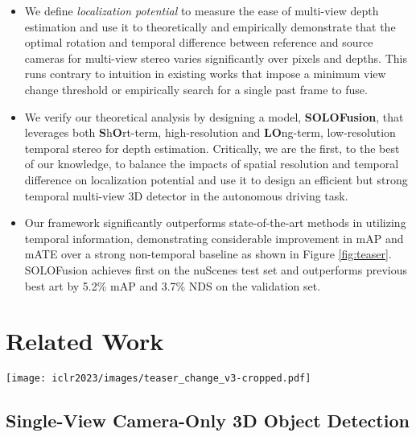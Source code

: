 \documentclass[runningheads, hyperfootnotes=false]{article}
\begin{document}
\begin{itemize}[itemsep=1pt,topsep=0pt]
    \item We define \textit{localization potential} to measure the ease of multi-view depth estimation and use it to theoretically and empirically demonstrate that the optimal rotation and temporal difference between reference and source cameras for multi-view stereo varies significantly over pixels and depths. This runs contrary to intuition in existing works that impose a minimum view change threshold or empirically search for a single past frame to fuse.
    \item We verify our theoretical analysis by designing a model, \textbf{SOLOFusion}, that leverages both \textbf{S}h\textbf{O}rt-term, high-resolution and \textbf{LO}ng-term, low-resolution temporal stereo for depth estimation. Critically, we are the first, to the best of our knowledge, to balance the impacts of spatial resolution and temporal difference on localization potential and use it to design an efficient but strong temporal multi-view 3D detector in the autonomous driving task.
    \item Our framework significantly outperforms state-of-the-art methods in utilizing temporal information, demonstrating considerable improvement in mAP and mATE over a strong non-temporal baseline as shown in Figure \ref{fig:teaser}. SOLOFusion achieves first on the nuScenes test set and outperforms previous best art by 5.2\% mAP and 3.7\% NDS on the validation set.
\end{itemize} \section{Related Work}
\begin{figure*}[t]
  \centering
  \texttt{[image: iclr2023/images/teaser\_change\_v3-cropped.pdf]}
  \captionsetup{aboveskip=0pt}\captionsetup{belowskip=0pt}\caption{We visualize the improvement of temporal models over their non-temporal baselines, using results from publications and released code. With short-term and long-term temporal fusion, our method best leverages temporal information, demonstrating 9.4\% and 12.9\% improvements in precision-recall (mAP) and localization quality (mATE), respectively.}
  \label{fig:teaser}
\end{figure*} \subsection{Single-View Camera-Only 3D Object Detection}
\end{document}
